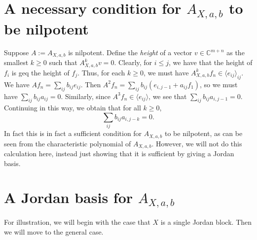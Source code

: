 \documentclass[12pt,psamsfonts]{article}
\begin{document}
\section{A necessary condition for \(A_{X, a, b}\) to be nilpotent}
Suppose \(A := A_{X, a, b}\) is nilpotent.
Define the \emph{height} of a vector \(v \in \mathbb{C}^{m + n}\) as the smallest \(k \geq 0\) such that \(A_{X, a, b}^k v = 0\).
Clearly, for \(i \leq j\), we have that the height of \(f_i\) is geq the height of \(f_j\).
Thus, for each \(k \geq 0\), we must have \(A_{X, a, b}^k f_n \in \langle e_{ij} \rangle_{ij}\).
We have \(Af_n = \sum_{ij} b_{ij} e_{ij}\).
Then \(A^2 f_n = \sum_{ij} b_{ij} (e_{i, j - 1} + a_{ij} f_1)\), so we must have \(\sum_{ij} b_{ij} a_{ij} = 0\).
Similarly, since \(A^3 f_n \in \langle e_{ij}\rangle\), we see that \(\sum_{ij} b_{ij} a_{i, j - 1} = 0\).
Continuing in this way, we obtain that for all \(k \geq 0\),
\begin{equation}\label{ab_nilp}\sum_{ij} b_{ij} a_{i,j - k} = 0.\end{equation}
In fact this is in fact a sufficient condition for \(A_{X, a, b}\) to be nilpotent, as can be seen from the characteristic polynomial of \(A_{X, a, b}\).
However, we will not do this calculation here, instead just showing that it is sufficient by giving a Jordan basis.


\section{A Jordan basis for \(A_{X, a, b}\)}
For illustration, we will begin with the case that \(X\) is a single Jordan block.
Then we will move to the general case.
\end{document}
